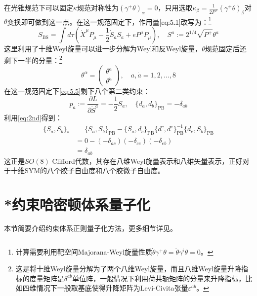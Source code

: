 在光锥规范下可以固定$\kappa$规范对称性为$(\gamma^+\theta)_\alpha=0$，只用选取$\kappa_\beta=\frac{1}{2P^+}(\gamma^+\theta)_\beta$对$\theta$变换即可做到这一点。在这一规范固定下，作用量\ref{eq:5.1}改写为：\footnote{计算需要利用靶空间Majorana-Weyl旋量性质$\dot{\theta}\gamma^+\theta=\dot{\theta}\gamma^i\theta=0$。}
\begin{equation}
S_{\text{BS}}=\int d\tau\left(\dot{X}^\mu P_\mu-\frac{1}{2}\dot{S}_aS_a+eP^\mu P_\mu\right),\quad S^a:=2^{1/4}\sqrt{P^+}\theta^a
\end{equation}
这里利用了十维Weyl旋量可以进一步分解为Weyl和反Weyl旋量，$\theta$规范固定后还剩下一半的分量：\footnote{这是将十维Weyl旋量分解为了两个八维Weyl旋量，而且八维Weyl旋量升降指标的度量矩阵是$\delta^{ab}$单位阵，一般情况下利用荷共轭矩阵的分量来升降指标\cite{Freedman:2012zz}，比如四维情况下一般取基底使得升降矩阵为Levi-Civita张量$\varepsilon^{ab}$。}
\begin{equation}
	\theta^\alpha=\begin{pmatrix}\theta^a\\\theta^{\dot{a}}\end{pmatrix},\quad a,\dot{a}=1,2,\ldots,8
\end{equation}
在这一规范固定下\ref{eq:5.5}剩下八个第二类约束：
\begin{equation}
	p_a:=\frac{\partial L}{\partial\dot{S}^a}=-\frac{1}{2}S_a,\quad \{d_a,d_b\}_{\mathrm{PB}}=-\delta_{ab}
\end{equation}
利用\ref{eq:2nd}得到：
\begin{equation}
	\label{eq:5.10}
	\begin{aligned}
		\{S_a,S_b\}_*&=\{S_a,S_b\}_{\mathrm{PB}}-\{S_a,d_c\}_{\mathrm{PB}}\{d^c,d^e\}_{\mathrm{PB}}^{-1}\{d_e,S_b\}_{\mathrm{PB}}\\&=0-(-\delta_{ac})(-\delta_{ce})(-\delta_{eb})\\&=\delta_{ab}
	\end{aligned}
\end{equation}
这正是$SO(8)$ Clifford代数，其存在八维Weyl旋量表示和八维矢量表示，正好对于十维SYM的八个胶子自由度和八个胶微子自由度。
\section{*约束哈密顿体系量子化}
\label{sec:5.2}
本节简要介绍约束体系正则量子化方法，更多细节详见\cite{lcb,dirac}。
